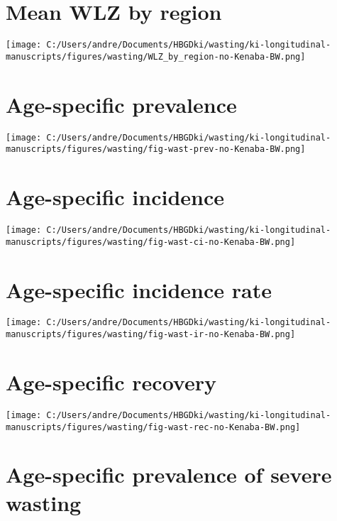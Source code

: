\documentclass[
  9pt,
]{book}
\begin{document}
\hypertarget{mean-wlz-by-region}{%
\section{Mean WLZ by region}\label{mean-wlz-by-region}}

\texttt{[image: C:/Users/andre/Documents/HBGDki/wasting/ki-longitudinal-manuscripts/figures/wasting/WLZ\_by\_region-no-Kenaba-BW.png]}

\hypertarget{age-specific-prevalence-2}{%
\section{Age-specific prevalence}\label{age-specific-prevalence-2}}

\texttt{[image: C:/Users/andre/Documents/HBGDki/wasting/ki-longitudinal-manuscripts/figures/wasting/fig-wast-prev-no-Kenaba-BW.png]}

\hypertarget{age-specific-incidence-1}{%
\section{Age-specific incidence}\label{age-specific-incidence-1}}

\texttt{[image: C:/Users/andre/Documents/HBGDki/wasting/ki-longitudinal-manuscripts/figures/wasting/fig-wast-ci-no-Kenaba-BW.png]}

\hypertarget{age-specific-incidence-rate-1}{%
\section{Age-specific incidence rate}\label{age-specific-incidence-rate-1}}

\texttt{[image: C:/Users/andre/Documents/HBGDki/wasting/ki-longitudinal-manuscripts/figures/wasting/fig-wast-ir-no-Kenaba-BW.png]}

\hypertarget{age-specific-recovery-1}{%
\section{Age-specific recovery}\label{age-specific-recovery-1}}

\texttt{[image: C:/Users/andre/Documents/HBGDki/wasting/ki-longitudinal-manuscripts/figures/wasting/fig-wast-rec-no-Kenaba-BW.png]}

\hypertarget{age-specific-prevalence-of-severe-wasting-2}{%
\section{Age-specific prevalence of severe wasting}\label{age-specific-prevalence-of-severe-wasting-2}}
\end{document}

